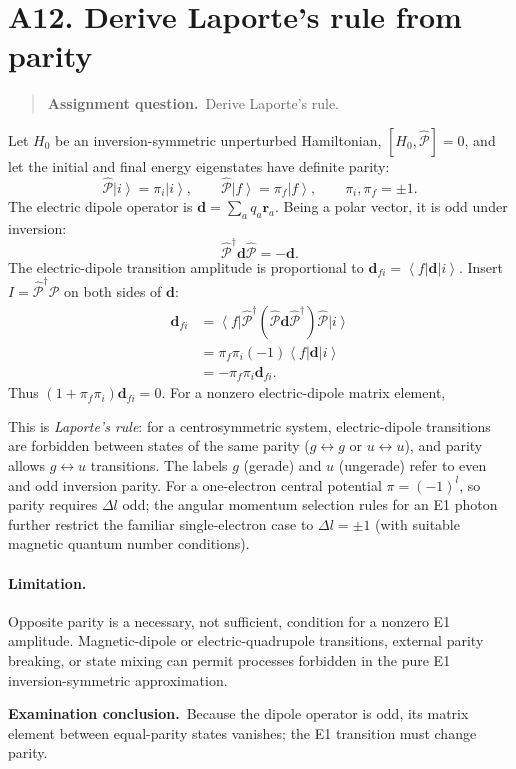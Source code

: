 \documentclass[11pt,a4paper]{article}
\theoremstyle{definition}
\newcommand{\ket}[1]{\left|#1\right\rangle}
\newcommand{\bra}[1]{\left\langle#1\right|}
\newcommand{\PP}{\hat{\mathcal P}}
\newcommand{\result}[1]{\begin{center}\fcolorbox{light}{white}{\begin{minipage}{0.88\textwidth}\centering\vspace{2pt}\(\displaystyle #1\)\vspace{2pt}\end{minipage}}\end{center}}
\newenvironment{question}{\begin{quote}\small\noindent\textbf{Assignment question.}\ }{\end{quote}}
\newcommand{\exam}[1]{\par\medskip\noindent\textbf{Examination conclusion.}\ #1\par}
\begin{document}
\section{A12. Derive Laporte's rule from parity}
\begin{question}Derive Laporte's rule.\end{question}
Let $H_0$ be an inversion-symmetric unperturbed Hamiltonian, $[H_0,\PP]=0$, and let the initial and final energy eigenstates have definite parity:
\begin{equation}
\PP\ket i=\pi_i\ket i,\qquad\PP\ket f=\pi_f\ket f,\qquad\pi_i,\pi_f=\pm1.
\end{equation}
The electric dipole operator is $\mathbf d=\sum_a q_a\mathbf r_a$. Being a polar vector, it is odd under inversion:
\begin{equation}
\PP^\dagger\mathbf d\PP=-\mathbf d.
\end{equation}
The electric-dipole transition amplitude is proportional to $\mathbf d_{fi}=\bra f\mathbf d\ket i$. Insert $I=\PP^\dagger\PP$ on both sides of $\mathbf d$:
\begin{align}
\mathbf d_{fi}
&=\bra f\PP^\dagger(\PP\mathbf d\PP^\dagger)\PP\ket i\\
&=\pi_f\pi_i(-1)\bra f\mathbf d\ket i\\
&=-\pi_f\pi_i\mathbf d_{fi}.
\end{align}
Thus $(1+\pi_f\pi_i)\mathbf d_{fi}=0$. For a nonzero electric-dipole matrix element,
\result{\pi_f\pi_i=-1\quad\Longleftrightarrow\quad\pi_f=-\pi_i.}
This is \emph{Laporte's rule}: for a centrosymmetric system, electric-dipole transitions are forbidden between states of the same parity ($g\leftrightarrow g$ or $u\leftrightarrow u$), and parity allows $g\leftrightarrow u$ transitions. The labels $g$ (gerade) and $u$ (ungerade) refer to even and odd inversion parity.
For a one-electron central potential $\pi=(-1)^l$, so parity requires $\Delta l$ odd; the angular momentum selection rules for an E1 photon further restrict the familiar single-electron case to $\Delta l=\pm1$ (with suitable magnetic quantum number conditions).
\paragraph{Limitation.} Opposite parity is a necessary, not sufficient, condition for a nonzero E1 amplitude. Magnetic-dipole or electric-quadrupole transitions, external parity breaking, or state mixing can permit processes forbidden in the pure E1 inversion-symmetric approximation.
\exam{Because the dipole operator is odd, its matrix element between equal-parity states vanishes; the E1 transition must change parity.}
\end{document}
